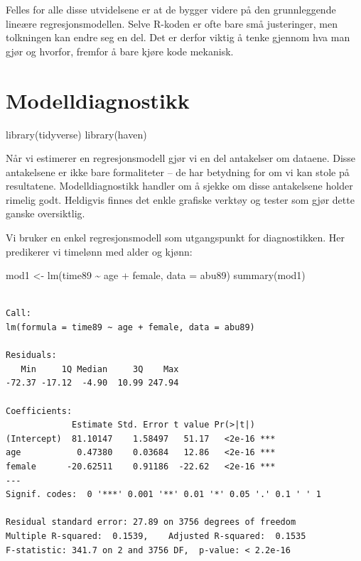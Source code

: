 \documentclass[
  norsk,
  letterpaper,
  DIV=11,
  numbers=noendperiod]{scrreprt}
\newenvironment{Shaded}{\begin{snugshade}}{\end{snugshade}}
\newcommand{\AttributeTok}[1]{\textcolor[rgb]{0.40,0.45,0.13}{#1}}
\newcommand{\FunctionTok}[1]{\textcolor[rgb]{0.28,0.35,0.67}{#1}}
\newcommand{\NormalTok}[1]{\textcolor[rgb]{0.00,0.23,0.31}{#1}}
\newcommand{\OtherTok}[1]{\textcolor[rgb]{0.00,0.23,0.31}{#1}}
\newcommand{\SpecialCharTok}[1]{\textcolor[rgb]{0.37,0.37,0.37}{#1}}
\theoremstyle{definition}
\theoremstyle{remark}
\begin{document}
Felles for alle disse utvidelsene er at de bygger videre på den
grunnleggende lineære regresjonsmodellen. Selve R-koden er ofte bare små
justeringer, men tolkningen kan endre seg en del. Det er derfor viktig å
tenke gjennom hva man gjør og hvorfor, fremfor å bare kjøre kode
mekanisk.

\chapter{Modelldiagnostikk}\label{modelldiagnostikk}

\begin{Shaded}
\begin{Highlighting}[]
\FunctionTok{library}\NormalTok{(tidyverse)}
\FunctionTok{library}\NormalTok{(haven)}
\end{Highlighting}
\end{Shaded}

Når vi estimerer en regresjonsmodell gjør vi en del antakelser om
dataene. Disse antakelsene er ikke bare formaliteter -- de har betydning
for om vi kan stole på resultatene. Modelldiagnostikk handler om å
sjekke om disse antakelsene holder rimelig godt. Heldigvis finnes det
enkle grafiske verktøy og tester som gjør dette ganske oversiktlig.

Vi bruker en enkel regresjonsmodell som utgangspunkt for diagnostikken.
Her predikerer vi timelønn med alder og kjønn:

\begin{Shaded}
\begin{Highlighting}[]
\NormalTok{mod1 }\OtherTok{\textless{}{-}} \FunctionTok{lm}\NormalTok{(time89 }\SpecialCharTok{\textasciitilde{}}\NormalTok{ age }\SpecialCharTok{+}\NormalTok{ female, }\AttributeTok{data =}\NormalTok{ abu89)}
\FunctionTok{summary}\NormalTok{(mod1)}
\end{Highlighting}
\end{Shaded}

\begin{verbatim}

Call:
lm(formula = time89 ~ age + female, data = abu89)

Residuals:
   Min     1Q Median     3Q    Max 
-72.37 -17.12  -4.90  10.99 247.94 

Coefficients:
             Estimate Std. Error t value Pr(>|t|)    
(Intercept)  81.10147    1.58497   51.17   <2e-16 ***
age           0.47380    0.03684   12.86   <2e-16 ***
female      -20.62511    0.91186  -22.62   <2e-16 ***
---
Signif. codes:  0 '***' 0.001 '**' 0.01 '*' 0.05 '.' 0.1 ' ' 1

Residual standard error: 27.89 on 3756 degrees of freedom
Multiple R-squared:  0.1539,    Adjusted R-squared:  0.1535 
F-statistic: 341.7 on 2 and 3756 DF,  p-value: < 2.2e-16
\end{verbatim}
\end{document}
